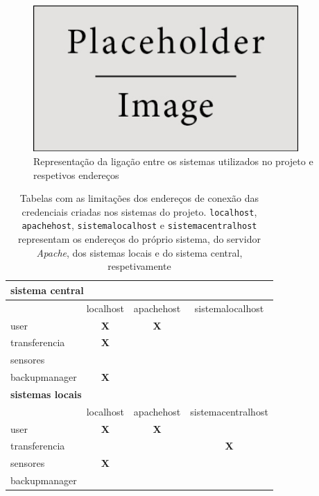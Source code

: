 \documentclass[11pt,twoside,a4paper]{report}
\begin{document}
\begin{figure}
	\begin{center}
		\includegraphics[width=0.9\textwidth]{placeholder} %
		\caption{Representação da ligação entre os sistemas utilizados no projeto e respetivos endereços}
		\label{fig:utilizadores2}
	\end{center}
\end{figure}
\begin{table}
	\centering
	\begin{tabular}{|l|c|c|c|}
		\multicolumn{4}{l}{\textbf{sistema central}} \\ \hline
		\makecell{} & localhost & apachehost & sistemalocalhost \\ \hline
		user & \textbf{X} & \textbf{X} & \\ \hline
		transferencia & \textbf{X} & & \\ \hline
		sensores & & & \\ \hline
		backupmanager & \textbf{X} & & \\ \hline
		\multicolumn{4}{l}{\textbf{sistemas locais}} \\ \hline
		\makecell{} & localhost & apachehost & sistemacentralhost \\ \hline
		user & \textbf{X} & \textbf{X} & \\ \hline
		transferencia & & & \textbf{X} \\ \hline
		sensores & \textbf{X} & & \\ \hline
		backupmanager & & & \\ \hline
	\end{tabular}
	\caption[Tabelas com as limitações dos endereços de conexão das credenciais criadas nos sistemas do projeto]{Tabelas com as limitações dos endereços de conexão das credenciais criadas nos sistemas do projeto. \texttt{localhost}, \texttt{apachehost}, \texttt{sistemalocalhost} e \texttt{sistemacentralhost} representam os endereços do próprio sistema, do servidor \textit{Apache}, dos sistemas locais e do sistema central, respetivamente}
	\label{tab:utilizadores3}
\end{table}
\end{document}
